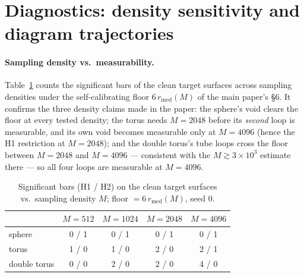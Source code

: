 \section{Diagnostics: density sensitivity and diagram trajectories}
\label{app:diagnostics}


\paragraph{Sampling density vs.\ measurability.}
Table~\ref{tab:msens} counts the significant bars of the clean target
surfaces across sampling densities under the self-calibrating floor
$6\,r_{\mathrm{med}}(M)$ of the main paper's \S6. It confirms the three
density claims made in the paper: the sphere's void clears the floor at
every tested density; the torus needs $M{=}2048$ before its \emph{second}
loop is measurable, and its own void becomes measurable only at $M{=}4096$
(hence the H1 restriction at $M{=}2048$); and the double torus's tube
loops cross the floor between $M{=}2048$ and $M{=}4096$ --- consistent
with the $M\gtrsim3{\times}10^{3}$ estimate there ---
so all four loops are measurable at $M{=}4096$.

\begin{table}[t]
\centering\small
\caption{Significant bars (H1 / H2) on the clean target surfaces vs.\
sampling density $M$; floor $=6\,r_{\mathrm{med}}(M)$, seed 0.}
\label{tab:msens}
\setlength{\tabcolsep}{4pt}
\begin{tabular}{lcccc}
\toprule
 & $M{=}512$ & $M{=}1024$ & $M{=}2048$ & $M{=}4096$ \\
\midrule
sphere       & 0 / 1 & 0 / 1 & 0 / 1 & 0 / 1 \\
torus        & 1 / 0 & 1 / 0 & 2 / 0 & 2 / 1 \\
double torus & 0 / 0 & 2 / 0 & 2 / 0 & 4 / 0 \\
\bottomrule
\end{tabular}
\end{table}

